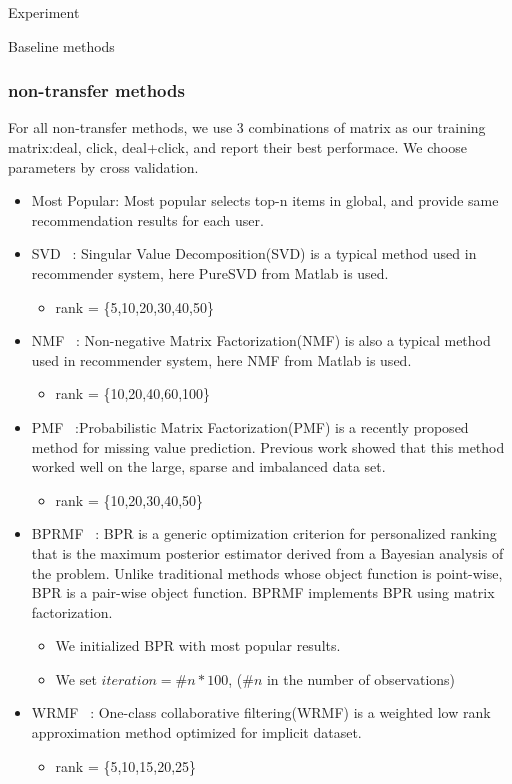 \begin{section}{Experiment}
\begin{subsection}{Baseline methods}
\subsubsection{non-transfer methods}
\par{
  For all non-transfer methods, we use 3 combinations of matrix as our training matrix:{deal, click, deal+click}, and report their best performace. We choose parameters by cross validation.
  \begin{itemize}
    \item Most Popular: Most popular selects top-n items in global, and provide same recommendation results for each user.
    \item SVD ~\cite{paterek07}: Singular Value Decomposition(SVD) is a typical method used in recommender system, here PureSVD from Matlab is used.
      \begin{itemize}
      \item rank = \{5,10,20,30,40,50\}
      \end{itemize}
    \item NMF ~\cite{/computer/yehuda09matrix}: Non-negative Matrix Factorization(NMF) is also a typical method used in recommender system, here NMF from Matlab is used.
      \begin{itemize}
      \item rank = \{10,20,40,60,100\}
      \end{itemize}
    \item PMF ~\cite{/nips/SalMnih08}:Probabilistic Matrix Factorization(PMF) is a recently proposed method for missing value prediction. Previous work showed that this method worked well on the large, sparse and imbalanced data set.
      \begin{itemize}
      \item rank = \{10,20,30,40,50\}
      \end{itemize}
    \item BPRMF ~\cite{Rendle:2009:BBP:1795114.1795167}: BPR is a generic optimization criterion for personalized ranking that is the maximum posterior estimator derived from a Bayesian analysis of the problem. Unlike traditional methods whose object function is point-wise, BPR is a pair-wise object function. BPRMF implements BPR using matrix factorization.
      \begin{itemize}
      \item We initialized BPR with most popular results.
      \item We set $iteration = \#n * 100$, ($\#n$ in the number of observations)
      \end{itemize}
    \item WRMF ~\cite{4781145}: One-class collaborative filtering(WRMF) is a weighted low rank approximation method optimized for implicit dataset. 
      \begin{itemize}
      \item rank = \{5,10,15,20,25\}
    \end{itemize}
\end{itemize}
}
\end{subsection}
\end{section}
